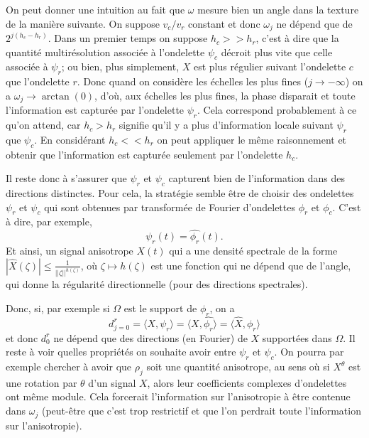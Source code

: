 \documentclass[11pt]{article} %
\begin{document}
\par
On peut donner une intuition au fait que $\omega$ mesure bien un angle dans la texture de la manière suivante. On suppose $v_c/v_r$ constant et donc $\omega_j$ ne dépend que de $2^{j(h_c - h_r)}$. Dans un premier temps on suppose $h_c >>h_r$, c'est à dire que la quantité multirésolution associée à l'ondelette $\psi_c$ décroit plus vite que celle associée à $\psi_r$; ou bien, plus simplement, $X$ est plus régulier suivant l'ondelette $c$ que l'ondelette $r$. 
\newline
Donc quand on considère les échelles les plus fines ($j\to -\infty$) on a $\omega_j \to \arctan(0)$, d'où, aux échelles les plus fines, la phase disparait et toute l'information est capturée par l'ondelette $\psi_r$. Cela correspond probablement à ce qu'on attend, car $h_c > h_r$ signifie qu'il y a plus d'information locale suivant $\psi_r$ que $\psi_c$.
\newline
En considérant $h_c<<h_r$ on peut appliquer le même raisonnement et obtenir que l'information est capturée seulement par l'ondelette $h_c$.
\par
Il reste donc à s'assurer que $\psi_r$ et $\psi_c$ capturent bien de l'information dans des directions distinctes. Pour cela, la stratégie semble être de choisir des ondelettes $\psi_r$ et $\psi_c$ qui sont obtenues par transformée de Fourier d'ondelettes $\phi_r$ et $\phi_c$.
C'est à dire, par exemple,
\begin{equation}
	\psi_r(t) = \hat{\phi_r}(t).
\end{equation}
Et ainsi, un signal anisotrope $X(t)$ qui a une densité spectrale de la forme $|\hat{X}(\zeta)| \leq \frac{1}{||\zeta||^{h(\zeta)}}$, où $\zeta \mapsto h(\zeta)$ est une fonction qui ne dépend que de l'angle, qui donne la régularité directionnelle (pour des directions spectrales).
\par
Donc, si, par exemple si $\Omega$ est le support de $\phi_r$, on a
\begin{equation}
	d_{j=0}^r = \langle X, \psi_r \rangle = \langle X, \hat{\phi_r}\rangle = \langle \hat{X}, \phi_r \rangle
\end{equation}
et donc $d_0^r$ ne dépend que des directions (en Fourier) de $X$ supportées dans $\Omega$. Il reste à voir quelles propriétés on souhaite avoir entre $\psi_r$ et $\psi_c$. On pourra par exemple chercher à avoir que $\rho_j$ soit une quantité anisotrope, au sens où si $X^\theta$ est une rotation par $\theta$ d'un signal $X$, alors leur coefficients complexes d'ondelettes ont même module. Cela forcerait l'information sur l'anisotropie à être contenue dans $\omega_j$ (peut-être que c'est trop restrictif et que l'on perdrait toute l'information sur l'anisotropie).
\end{document}
